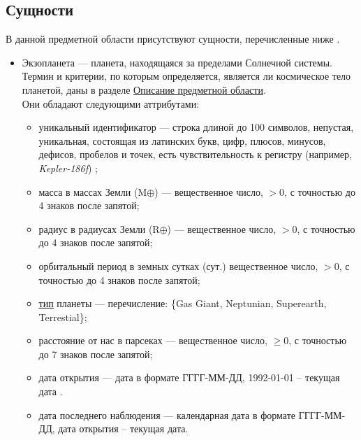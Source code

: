 \documentclass[14pt,a4paper]{extarticle}
\begin{document}
	\subsection{Сущности}
	В данной предметной области присутствуют сущности, перечисленные ниже \cite{entites}.
	\begin{itemize}
		\item Экзопланета --- планета, находящаяся за пределами Солнечной системы. Термин и критерии, по которым определяется, является ли космическое тело планетой, даны в разделе \hyperref[object-description]{\underline{Описание предметной области}}.\\
		Они обладают следующими аттрибутами:
		\begin{itemize}
			\item уникальный идентификатор --- строка длиной до 100 символов, непустая, уникальная, состоящая из латинских букв, цифр, плюсов, минусов, дефисов, пробелов и точек, есть чувствительность к регистру (например, \textit{Kepler-186f}) \cite{names-standards};
			\item масса в массах Земли (M$ \oplus $) --- вещественное число, $> 0$, с точностью до 4 знаков после запятой;
			\item радиус в радиусах Земли (R$ \oplus $) --- вещественное число, $> 0$, с точностью до 4 знаков после запятой;
			\item орбитальный период в земных сутках (сут.) вещественное число, $> 0$, с точностью до 4 знаков после запятой;
			\item \hyperref[types]{\underline{тип}} планеты --- перечисление: \{Gas Giant, Neptunian, Superearth, Terrestial\};
			\item расстояние от нас в парсеках --- вещественное число, $\geq 0$, с точностью до 7 знаков после запятой;
			\item дата открытия --- дата в формате ГГГГ-ММ-ДД, 1992-01-01 -- текущая дата \cite{first-exoplanet-date}.
			\item дата последнего наблюдения --- календарная дата в формате ГГГГ-ММ-ДД, дата открытия -- текущая дата.
		\end{itemize}
		

\end{itemize}
\end{document}
